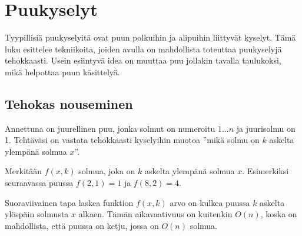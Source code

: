 \chapter{Puukyselyt}

Tyypillisiä puukyselyitä ovat
puun polkuihin ja alipuihin
liittyvät kyselyt.
Tämä luku esittelee
tekniikoita, joiden avulla on mahdollista
toteuttaa puukyselyjä tehokkaasti.
Usein esiintyvä idea on muuttaa
puu jollakin tavalla taulukoksi,
mikä helpottaa puun käsittelyä.
% 

\section{Tehokas nouseminen}

\begin{task}
Annettuna on juurellinen puu, jonka solmut on numeroitu
$1 \ldots n$ ja juurisolmu on 1.
Tehtäväsi on vastata
tehokkaasti kyselyihin muotoa ''mikä solmu on
$k$ askelta ylempänä solmua $x$''.
\end{task}

Merkitään $f(x,k)$ solmua,
joka on $k$ askelta ylempänä solmua $x$.
Esimerkiksi seuraavassa puussa
$f(2,1)=1$ ja $f(8,2)=4$.

\begin{center}
\end{center}

Suoraviivainen tapa laskea funktion $f(x,k)$
arvo on kulkea puussa $k$ askelta ylöspäin
solmusta $x$ alkaen.
Tämän aikavaativuus on kuitenkin $O(n)$,
koska on mahdollista, että puussa on
ketju, jossa on $O(n)$ solmua.

